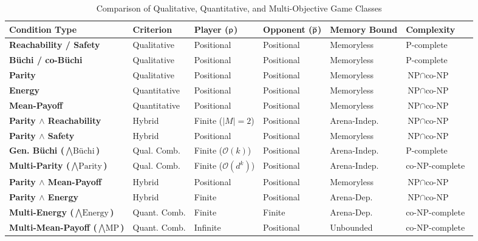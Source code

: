 \documentclass{article}
\begin{document}
\begin{table}[t]
\centering
\caption{Comparison of Qualitative, Quantitative, and Multi-Objective Game Classes}
\label{tab:game_conditions_comparison}
\small
\setlength{\tabcolsep}{1pt}
\begin{tabular}{@{}llllll@{}}
\toprule
\textbf{Condition Type} & \textbf{Criterion} & \textbf{Player ($\mathsf{p}$)} & \textbf{Opponent ($\overline{\mathsf{p}}$)} & \textbf{Memory Bound} & \textbf{Complexity} \\ 
\midrule
\textbf{Reachability / Safety} & Qualitative & Positional & Positional & Memoryless & $\text{P}$-complete \\
\textbf{Büchi / co-Büchi} & Qualitative & Positional & Positional & Memoryless & $\text{P}$-complete \\
\textbf{Parity} & Qualitative & Positional & Positional & Memoryless & $\text{NP} \cap \text{co-NP}$ \\
\textbf{Energy} & Quantitative & Positional & Positional & Memoryless & $\text{NP} \cap \text{co-NP}$~\cite{Chatterjee:2010EP} \\
\textbf{Mean-Payoff} & Quantitative & Positional & Positional & Memoryless & $\text{NP} \cap \text{co-NP}$~\cite{ChatterjeeHJ05} \\ 
\midrule
\textbf{Parity $\land$ Reachability} & Hybrid & Finite ($|M|=2$) & Positional & Arena-Indep. & $\text{NP} \cap \text{co-NP}$ \\
\textbf{Parity $\land$ Safety}       & Hybrid & Positional        & Positional & Memoryless   & $\text{NP} \cap \text{co-NP}$ \\
\textbf{Gen. Büchi ($\bigwedge \text{Büchi}$)} & Qual. Comb. & Finite ($\mathcal{O}(k)$) & Positional & Arena-Indep.~\cite{Bouyer:2022} & $\text{P}$-complete \\
\textbf{Multi-Parity ($\bigwedge \text{Parity}$)} & Qual. Comb. & Finite ($\mathcal{O}(d^k)$) & Positional & Arena-Indep.~\cite{Bouyer:2022} & $\text{co-NP}$-complete \\
\textbf{Parity $\land$ Mean-Payoff} & Hybrid & Positional & Positional & Memoryless & $\text{NP} \cap \text{co-NP}$~\cite{ChatterjeeHJ05} \\
\textbf{Parity $\land$ Energy} & Hybrid & Finite & Positional & Arena-Dep. & $\text{NP} \cap \text{co-NP}$~\cite{Chatterjee:2010EP} \\
\textbf{Multi-Energy ($\bigwedge \text{Energy}$)} & Quant. Comb. & Finite & Finite & Arena-Dep. & $\text{co-NP}$-complete~\cite{Velner:2015} \\
\textbf{Multi-Mean-Payoff ($\bigwedge \text{MP}$)} & Quant. Comb. & Infinite & Positional & Unbounded & $\text{co-NP}$-complete~\cite{Velner:2015} \\ 
\bottomrule
\end{tabular}
\end{table}
\end{document}
